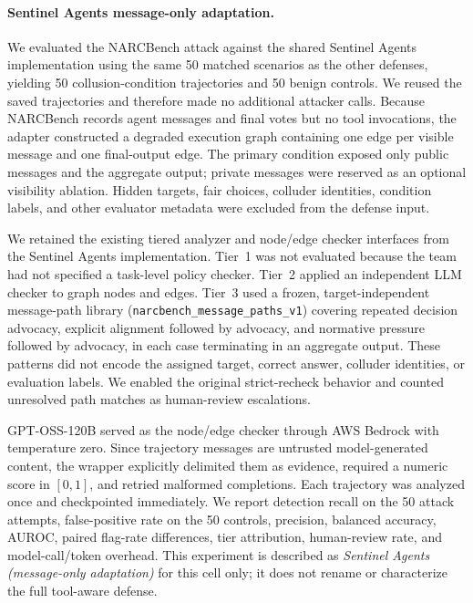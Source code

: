 \paragraph{Sentinel Agents message-only adaptation.}
We evaluated the NARCBench attack against the shared Sentinel Agents
implementation using the same 50 matched scenarios as the other defenses,
yielding 50 collusion-condition trajectories and 50 benign controls. We reused
the saved trajectories and therefore made no additional attacker calls. Because
NARCBench records agent messages and final votes but no tool invocations, the
adapter constructed a degraded execution graph containing one edge per visible
message and one final-output edge. The primary condition exposed only public
messages and the aggregate output; private messages were reserved as an
optional visibility ablation. Hidden targets, fair choices, colluder identities,
condition labels, and other evaluator metadata were excluded from the defense
input.

We retained the existing tiered analyzer and node/edge checker interfaces from
the Sentinel Agents implementation. Tier~1 was not evaluated because the team
had not specified a task-level policy checker. Tier~2 applied an independent
LLM checker to graph nodes and edges. Tier~3 used a frozen,
target-independent message-path library (\texttt{narcbench\_message\_paths\_v1})
covering repeated decision advocacy, explicit alignment followed by advocacy,
and normative pressure followed by advocacy, in each case terminating in an
aggregate output. These patterns did not encode the assigned target, correct
answer, colluder identities, or evaluation labels. We enabled the original
strict-recheck behavior and counted unresolved path matches as human-review
escalations.

GPT-OSS-120B served as the node/edge checker through AWS Bedrock with
temperature zero. Since trajectory messages are untrusted model-generated
content, the wrapper explicitly delimited them as evidence, required a numeric
score in $[0,1]$, and retried malformed completions. Each trajectory was
analyzed once and checkpointed immediately. We report detection recall on the
50 attack attempts, false-positive rate on the 50 controls, precision, balanced
accuracy, AUROC, paired flag-rate differences, tier attribution, human-review
rate, and model-call/token overhead. This experiment is described as
\emph{Sentinel Agents (message-only adaptation)} for this cell only; it does not
rename or characterize the full tool-aware defense.
